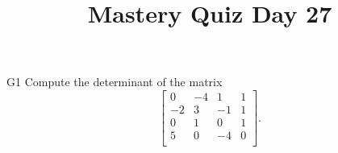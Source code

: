 \documentclass{sbgLAquiz}
\title{Mastery Quiz Day 27 }
\begin{document}
\begin{problem}{G1}
Compute the determinant of the matrix
\[
  \begin{bmatrix}
    0 & -4 & 1 & 1 \\
    -2 & 3 & -1 & 1 \\
    0 & 1 & 0 & 1 \\
    5 & 0 & -4 & 0 \\
  \end{bmatrix}
.\]
\end{problem}
\end{document}
